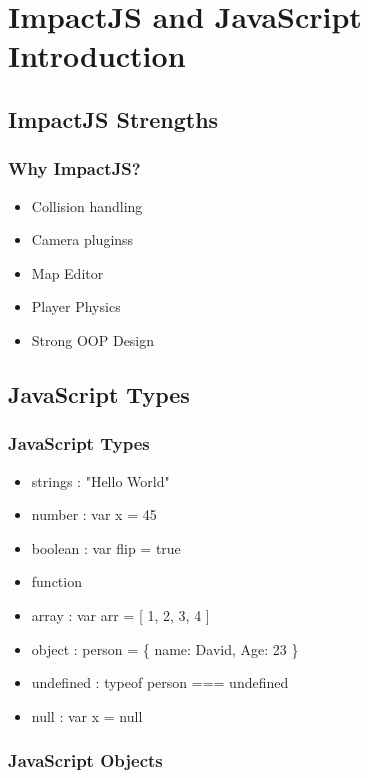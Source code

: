 \documentclass[red]{beamer}
\begin{document}
\section[Outline]{}

\section{ImpactJS and JavaScript Introduction}

\subsection{ImpactJS Strengths}

\begin{frame}
  \frametitle{Why ImpactJS?}   %

  \begin{itemize}
  \item Collision handling
  \item Camera pluginss
  \item Map Editor
  \item Player Physics
  \item Strong OOP Design
  \end{itemize}
\end{frame}

\subsection{JavaScript Types}

\begin{frame}
	\frametitle{JavaScript Types}
	 \begin{itemize}
  		\item<1-> strings : "Hello World"
 		\item<2-> number : var x = 45
 		\item<3-> boolean : var flip = true
		\item<4-> function
		\item<4-> array : var arr = [ 1, 2, 3, 4 ]
		\item<5->object : person = \{ name: David, Age: 23 \}
		\item<6->undefined : typeof person === undefined
		\item<7->null : var x = null
 	 \end{itemize}
\end{frame}

\begin{frame}
 	\frametitle{JavaScript Objects}
		\lstI
\end{frame}
\end{document}
